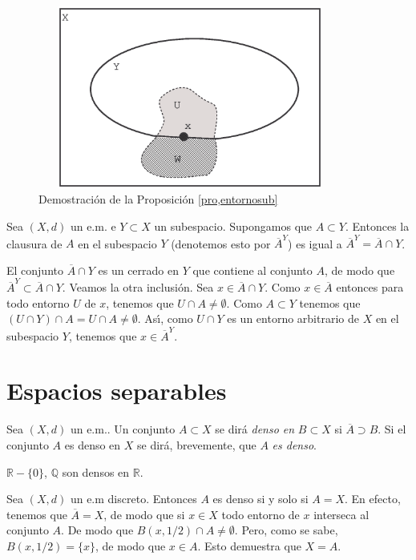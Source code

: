\begin{figure}[h]
\begin{center}
    \includegraphics[height=6cm, width=10cm]{entosub.eps}
    \caption{Demostraci\'on de la Proposici\'on
    \ref{pro,entornosub}}\label{fig,entosub}
\end{center}
\end{figure}





\begin{proposicion} Sea $(X,d)$ un e.m. e $Y\subset X$ un
subespacio. Supongamos que $A\subset Y$. Entonces la clausura de
$A$ en el subespacio $Y$ (denotemos esto por $\overline{A}^Y$) es
igual a $\overline{A}^Y=\overline{A}\cap Y$.
\end{proposicion}
\begin{demo} El conjunto $\overline{A}\cap Y$ es un cerrado en $Y$
que contiene al conjunto $A$, de modo que
$\overline{A}^Y\subset\overline{A}\cap Y$. Veamos la otra
inclusi\'on. Sea $x\in \overline{A}\cap Y$. Como $x\in
\overline{A}$ entonces para todo entorno $U$ de $x$, tenemos que
$U\cap A\neq\emptyset$. Como $A\subset Y$ tenemos que $(U\cap
Y)\cap A=U\cap A\neq\emptyset$. As\'{\i}, como $U\cap Y$ es un
entorno  arbitrario de $X$ en el subespacio $Y$, tenemos que
$x\in\overline{A}^Y$.
\end{demo}
\section{Espacios separables}
\begin{definicion} Sea $(X,d)$ un e.m.. Un conjunto $A\subset X$
se dir\'a \emph{denso en }$B\subset X$ si $\overline{A}\supset B$.
Si el conjunto $A$ es denso en $X$ se dir\'a, brevemente, que $A$
\emph{es denso}.
\end{definicion}
\begin{ejemplo} $\mathbb{R}-\{0\}$, $\mathbb{Q}$ son densos en $\mathbb{R}$.
\end{ejemplo}
\begin{ejemplo} Sea $(X,d)$ un e.m discreto. Entonces $A$ es denso
si y solo si $A=X$. En efecto, tenemos que $\overline{A}=X$, de
modo que si $x\in X$  todo entorno de $x$ interseca al conjunto
$A$. De modo que  $B(x,1/2)\cap A\neq\emptyset$. Pero, como se
sabe, $B(x,1/2)=\{x\}$, de modo que $x\in A$. Esto demuestra que
$X=A$.
\end{ejemplo}

